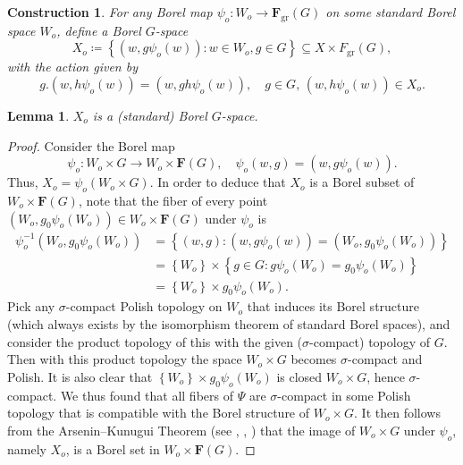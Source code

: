 \documentclass{amsart}
\numberwithin{equation}{subsection}
\newtheorem{lem}[thm]{Lemma}
\newtheorem{con}[thm]{Construction}
\begin{document}
\begin{con}
\label{cnst:psispace}
For any Borel map \(\psi_{o}:W_{o}\to\mathbf{F}_{\mathrm{gr}}\left(G\right)\) on some standard Borel space \(W_{o}\), define a Borel \(G\)-space
\[X_{o}\coloneqq\left\{\left(w,g\psi_{o}\left(w\right)\right):w\in W_{o},g\in G\right\}\subseteq X\times F_{\mathrm{gr}}(G),\]
with the action given by
\[g.\left(w,h\psi_{o}\left(w\right)\right)=\left(w,gh\psi_{o}\left(w\right)\right),\quad g\in G,\,\left(w,h\psi_{o}\left(w\right)\right)\in X_{o}.\]
\end{con}

\begin{lem}
\label{lem:standard}
\(X_{o}\) is a (standard) Borel \(G\)-space.
\end{lem}

\begin{proof}
Consider the Borel map
\[\psi_{o}:W_{o}\times G\to W_{o}\times\mathbf{F}\left(G\right), \quad\psi_{o}\left(w,g\right)=\left(w,g\psi_{o}\left(w\right)\right).\]
Thus, \(X_{o}=\psi_{o}\left(W_{o}\times G\right)\). In order to deduce that \(X_{o}\) is a Borel subset of \(W_{o}\times\mathbf{F}\left(G\right)\), note that the fiber of every point \(\left(W_{o},g_{0}\psi_{o}\left(W_{o}\right)\right)\in W_{o}\times\mathbf{F}\left(G\right)\) under \(\psi_{o}\) is
\begin{align*}
\psi_{o}^{-1}\left(W_{o},g_{0}\psi_{o}\left(W_{o}\right)\right)
&=\left\{ \left(w,g\right):\left(w,g\psi_{o}\left(w\right)\right)=\left(W_{o},g_{0}\psi_{o}\left(W_{o}\right)\right)\right\}\\
&=\left\{ W_{o}\right\} \times\left\{ g\in G:g\psi_{o}\left(W_{o}\right)=g_{0}\psi_{o}\left(W_{o}\right)\right\}\\
&=\left\{ W_{o}\right\} \times g_{0}\psi_{o}\left(W_{o}\right).
\end{align*}
Pick any \(\sigma\)-compact Polish topology on \(W_{o}\) that induces its Borel structure (which always exists by the isomorphism theorem of standard Borel spaces), and consider the product topology of this with the given (\(\sigma\)-compact) topology of \(G\). Then with this product topology the space \(W_{o}\times G\) becomes \(\sigma\)-compact and Polish. It is also clear that \(\left\{ W_{o}\right\} \times g_{0}\psi_{o}\left(W_{o}\right)\) is closed \(W_{o}\times G\), hence \(\sigma\)-compact. We thus found that all fibers of \(\Psi\) are \(\sigma\)-compact in some Polish topology that is compatible with the Borel structure of \(W_{o}\times G\). It then follows from the Arsenin--Kunugui Theorem (see \cite[Theorem (18.18)]{kechris2012descriptive}, \cite[Theorem 7.5.1]{gao2008invariant}, \cite[Corollary A.6]{zimmer2013ergodic}) that the image of \(W_{o}\times G\) under \(\psi_{o}\), namely \(X_{o}\), is a Borel set in \(W_{o}\times\mathbf{F}\left(G\right)\).
\end{proof}
\end{document}
